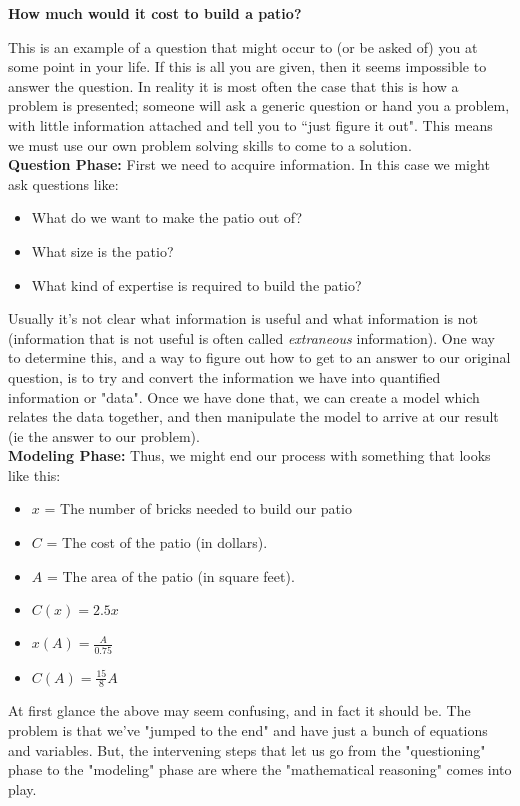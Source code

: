 \documentclass{ximera}
\begin{document}
    \begin{exploration}
        {\large \bfseries How much would it cost to build a patio?}
        
        This is an example of a question that might occur to (or be asked of) you at some point in your life. If this is all you are given, then it seems impossible to answer the question. In reality it is most often the case that this is how a problem is presented; someone will ask a generic question or hand you a problem, with little information attached and tell you to ``just figure it out". This means we must use our own problem solving skills to come to a solution.\\
        
        {\bfseries Question Phase:} First we need to acquire information. In this case we might ask questions like:
        \begin{itemize}
            \item What do we want to make the patio out of?
            \item What size is the patio?
            \item What kind of expertise is required to build the patio?
        \end{itemize}
        Usually it's not clear what information is useful and what information is not (information that is not useful is often called \textit{extraneous} information). One way to determine this, and a way to figure out how to get to an answer to our original question, is to try and convert the information we have into quantified information or "data". Once we have done that, we can create a model which relates the data together, and then manipulate the model to arrive at our result (ie the answer to our problem).\\
        
        {\bfseries Modeling Phase:}
        Thus, we might end our process with something that looks like this:
        \begin{itemize}
            \item $x$ = The number of bricks needed to build our patio
            \item $C$ = The cost of the patio (in dollars).
            \item $A$ = The area of the patio (in square feet).
            \item $C(x) = 2.5x$
            \item $x(A) = \frac{A}{0.75}$
            \item $C(A) = \frac{15}{8}A$
        \end{itemize}
        At first glance the above may seem confusing, and in fact it should be. The problem is that we've "jumped to the end" and have just a bunch of equations and variables. But, the intervening steps that let us go from the "questioning" phase to the "modeling" phase are where the "mathematical reasoning" comes into play.\\
        

\end{exploration}
\end{document}
